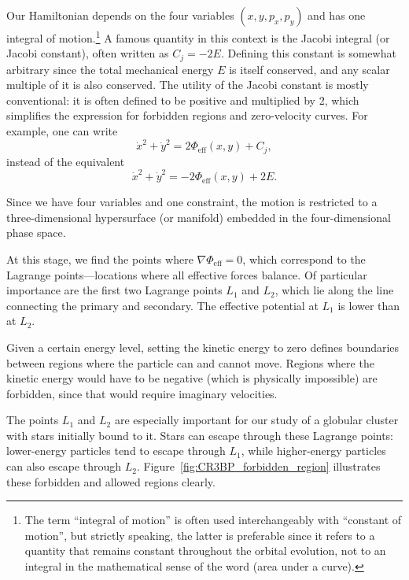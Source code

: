        Our Hamiltonian depends on the four variables \((x, y, p_x, p_y)\) and has one integral of motion.\footnote{The term ``integral of motion'' is often used interchangeably with ``constant of motion'', but strictly speaking, the latter is preferable since it refers to a quantity that remains constant throughout the orbital evolution, not to an integral in the mathematical sense of the word (area under a curve).} A famous quantity in this context is the Jacobi integral (or Jacobi constant), often written as \(C_j = -2E\). Defining this constant is somewhat arbitrary since the total mechanical energy \(E\) is itself conserved, and any scalar multiple of it is also conserved. The utility of the Jacobi constant is mostly conventional: it is often defined to be positive and multiplied by 2, which simplifies the expression for forbidden regions and zero-velocity curves. For example, one can write
        \[
        \dot{x}^2 + \dot{y}^2 = 2 \Phi_\mathrm{eff}(x,y) + C_j,
        \]
        instead of the equivalent
        \[
        \dot{x}^2 + \dot{y}^2 = -2 \Phi_\mathrm{eff}(x,y) + 2E.
        \]
        

        Since we have four variables and one constraint, the motion is restricted to a three-dimensional hypersurface (or manifold) embedded in the four-dimensional phase space.

        At this stage, we find the points where \(\nabla \Phi_\mathrm{eff} = 0\), which correspond to the Lagrange points—locations where all effective forces balance. Of particular importance are the first two Lagrange points \(L_1\) and \(L_2\), which lie along the line connecting the primary and secondary. The effective potential at \(L_1\) is lower than at \(L_2\).

        Given a certain energy level, setting the kinetic energy to zero defines boundaries between regions where the particle can and cannot move. Regions where the kinetic energy would have to be negative (which is physically impossible) are forbidden, since that would require imaginary velocities.

        The points \(L_1\) and \(L_2\) are especially important for our study of a globular cluster with stars initially bound to it. Stars can escape through these Lagrange points: lower-energy particles tend to escape through \(L_1\), while higher-energy particles can also escape through \(L_2\). Figure~\ref{fig:CR3BP_forbidden_region} illustrates these forbidden and allowed regions clearly.




